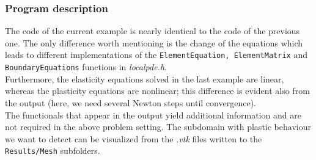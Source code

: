 \subsubsection{Program description}

The code of the current example is nearly identical to the code of the previous one. The only difference worth mentioning is the change of the equations which leads to different implementations of the \texttt{ElementEquation, ElementMatrix} and \texttt{BoundaryEquations} functions in \textit{localpde.h}.\\
Furthermore, the elasticity equations solved in the last example are linear, whereas the plasticity equations are nonlinear; this difference is evident also from the output (here, we need several Newton steps until convergence).\\
The functionals that appear in the output yield additional information and are not required in the above problem setting. The subdomain with plastic behaviour we want to detect can be visualized from the \textit{.vtk} files written to the \texttt{Results/Mesh} subfolders.